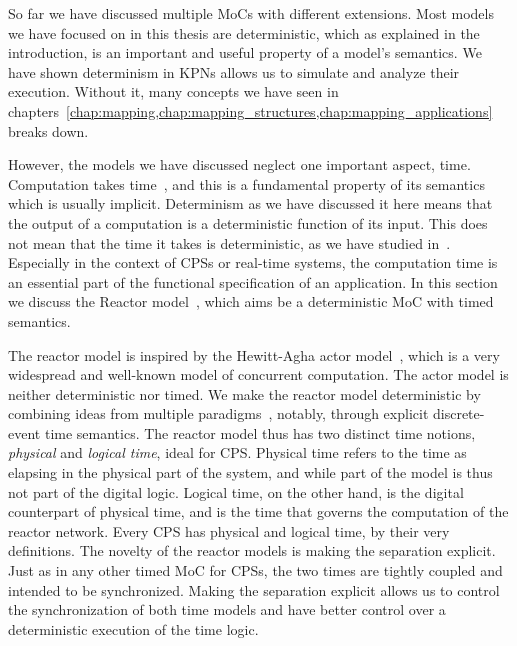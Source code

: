So far we have discussed multiple \acp{MoC} with different extensions.
Most models we have focused on in this thesis are deterministic, which as explained in the introduction, is an important and useful property of a model's semantics.
We have shown determinism in \acp{KPN} allows us to simulate and analyze their execution.
Without it, many concepts we have seen in chapters~\ref{chap:mapping,chap:mapping_structures,chap:mapping_applications} breaks down.

However, the models we have discussed neglect one important aspect, time.
Computation takes time~\cite{lee2009computing}, and this is a fundamental property of its semantics which is usually implicit.
Determinism as we have discussed it here means that the output of a computation is a deterministic function of its input.
This does not mean that the time it takes is deterministic, as we have studied in~\cite{goens_scopes17}.
Especially in the context of \acp{CPS} or real-time systems, the computation time is an essential part of the functional specification of an application.
In this section we discuss the Reactor model~\cite{lohstroh_dac19}, which aims be a deterministic \ac{MoC} with timed semantics.

The reactor model is inspired by the Hewitt-Agha actor model~\cite{agha}, which is a very widespread and well-known model of concurrent computation.
The actor model is neither deterministic nor timed.
We make the reactor model deterministic by combining ideas from multiple paradigms~\cite{lohstroh_fdl19}, notably, through explicit discrete-event time semantics.
The reactor model thus has two distinct time notions, \emph{physical} and \emph{logical time}, ideal for \ac{CPS}.
Physical time refers to the time as elapsing in the physical part of the system, and while part of the model is thus not part of the digital logic.
Logical time, on the other hand, is the digital counterpart of physical time, and is the time that governs the computation of the reactor network.
Every \ac{CPS} has physical and logical time, by their very definitions. The novelty of the reactor models is making the separation explicit.
Just as in any other timed \ac{MoC} for \acp{CPS}, the two times are tightly coupled and intended to be synchronized. 
Making the separation explicit allows us to control the synchronization of both time models and have better control over a deterministic execution of the time logic.

